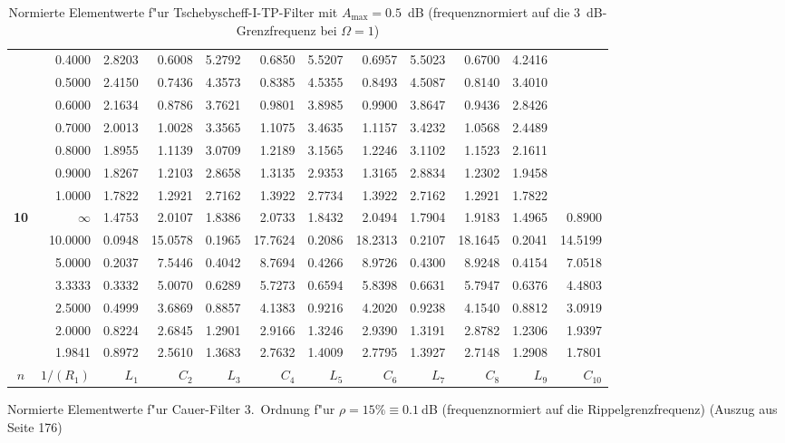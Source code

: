 \begin{table}[!htb]
\begin{center}
{\begin{tabular}{|c||r|r|r|r|r|r|r|r|r|r|r|}
&0.4000&2.8203&0.6008&5.2792&0.6850&5.5207&0.6957&5.5023&0.6700&4.2416&     \\
&0.5000&2.4150&0.7436&4.3573&0.8385&4.5355&0.8493&4.5087&0.8140&3.4010&     \\
&0.6000&2.1634&0.8786&3.7621&0.9801&3.8985&0.9900&3.8647&0.9436&2.8426&     \\
&0.7000&2.0013&1.0028&3.3565&1.1075&3.4635&1.1157&3.4232&1.0568&2.4489&     \\
&0.8000&1.8955&1.1139&3.0709&1.2189&3.1565&1.2246&3.1102&1.1523&2.1611&     \\
&0.9000&1.8267&1.2103&2.8658&1.3135&2.9353&1.3165&2.8834&1.2302&1.9458&     \\
&1.0000&1.7822&1.2921&2.7162&1.3922&2.7734&1.3922&2.7162&1.2921&1.7822&     \\ \hline
\textbf{ 10}&$\infty$&1.4753&2.0107&1.8386&2.0733&1.8432&2.0494&1.7904&1.9183&1.4965&0.8900\\
&10.0000&0.0948&15.0578&0.1965&17.7624&0.2086&18.2313&0.2107&18.1645&0.2041&14.5199\\
&5.0000&0.2037&7.5446&0.4042&8.7694&0.4266&8.9726&0.4300&8.9248&0.4154&7.0518\\
&3.3333&0.3332&5.0070&0.6289&5.7273&0.6594&5.8398&0.6631&5.7947&0.6376&4.4803\\
&2.5000&0.4999&3.6869&0.8857&4.1383&0.9216&4.2020&0.9238&4.1540&0.8812&3.0919\\
&2.0000&0.8224&2.6845&1.2901&2.9166&1.3246&2.9390&1.3191&2.8782&1.2306&1.9397\\
&1.9841&0.8972&2.5610&1.3683&2.7632&1.4009&2.7795&1.3927&2.7148&1.2908&1.7801\\  \hline \hline
$n$ & $1/(R_1)$ & $L_1$ & $C_2$ & $L_3$ & $C_4$ & $L_5$ & $C_6$ & $L_7$ & $C_8$ & $L_9$ & $C_{10}$\\ \hline
\end{tabular}\vspace*{-1mm}\caption{Normierte Elementwerte
    f"ur Tschebyscheff-I-TP-Filter mit $A_{\max}=0.5$~dB (frequenznormiert
    auf die 3~dB-Grenzfrequenz bei $\Omega=1$) \label{filter-tsch05db} }}
\end{center}
\vspace*{-6mm}
\end{table}%
\clearpage

\begin{table}[!htb]
\begin{center}
  \caption{Normierte Elementwerte f"ur Cauer-Filter 3.~Ordnung f"ur $\rho=15\%\equiv 0.1~$dB (frequenznormiert auf die Rippelgrenzfrequenz) (Auszug aus \cite{ZVE:67} Seite 176) \label{el-CC1}}
\end{center}
\vspace*{-6mm}
\end{table}
\clearpage

